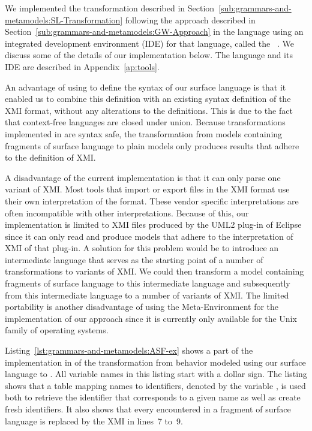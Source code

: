 We implemented the transformation described in Section~\ref{sub:grammars-and-metamodels:SL-Transformation} following the approach described in Section~\ref{sub:grammars-and-metamodels:GW-Approach} in the language \ASFSDF \cite{Deu96.asdf} using an integrated development environment (IDE) for that language, called the \ASFSDFME~\cite{Brand:2001:ASF}.
We discuss some of the details of our implementation below.
The language \ASFSDF and its IDE are described in Appendix~\ref{ap:tools}.

An advantage of using \SDF to define the syntax of our surface language is that it enabled us to combine this definition with an existing syntax definition of the XMI format, without any alterations to the definitions.
This is due to the fact that context-free languages are closed under union.
Because transformations implemented in \ASF are syntax safe, the transformation from \UML models containing fragments of surface language to plain \UML models only produces results that adhere to the definition of XMI.

A disadvantage of the current implementation is that it can only parse one variant of XMI.
Most tools that import or export files in the XMI format use their own interpretation of the format.
These vendor specific interpretations are often incompatible with other interpretations.
Because of this, our implementation is limited to XMI files produced by the UML2 plug-in of Eclipse since it can only read and produce models that adhere to the interpretation of XMI of that plug-in.
A solution for this problem would be to introduce an intermediate language that serves as the starting point of a number of transformations to variants of XMI.
We could then transform a model containing fragments of surface language to this intermediate language and subsequently from this intermediate language to a number of variants of XMI.
The limited portability is another disadvantage of using the Meta-Environment for the implementation of our approach since it is currently only available for the Unix family of operating systems.

Listing~\ref{lst:grammars-and-metamodels:ASF-ex} shows a part of the implementation in \ASF of the transformation from behavior modeled using our surface language to \Activities.
All variable names in this listing start with a dollar sign.
The listing shows that a table mapping names to identifiers, denoted by the variable , is used both to retrieve the identifier that corresponds to a given name as well as create fresh identifiers.
It also shows that every \ReadVariableAction encountered in a fragment of surface language is replaced by the XMI in lines~7 to~9.

